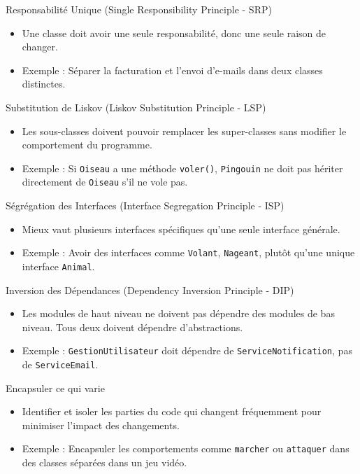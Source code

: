 \documentclass[aspectratio=169]{beamer}
\begin{document}
  \begin{frame}{Responsabilité Unique (Single Responsibility Principle - SRP)}
  \begin{itemize}
      \item Une classe doit avoir une seule responsabilité, donc une seule raison de changer.
      \item Exemple : Séparer la facturation et l'envoi d'e-mails dans deux classes distinctes.
  \end{itemize}
  \end{frame}

  \begin{frame}{Substitution de Liskov (Liskov Substitution Principle - LSP)}
  \begin{itemize}
      \item Les sous-classes doivent pouvoir remplacer les super-classes sans modifier le comportement du programme.
      \item Exemple : Si \texttt{Oiseau} a une méthode \texttt{voler()}, \texttt{Pingouin} ne doit pas hériter directement de \texttt{Oiseau} s'il ne vole pas.
  \end{itemize}
  \end{frame}

  \begin{frame}{Ségrégation des Interfaces (Interface Segregation Principle - ISP)}
  \begin{itemize}
      \item Mieux vaut plusieurs interfaces spécifiques qu'une seule interface générale.
      \item Exemple : Avoir des interfaces comme \texttt{Volant}, \texttt{Nageant}, plutôt qu'une unique interface \texttt{Animal}.
  \end{itemize}
  \end{frame}

  \begin{frame}{Inversion des Dépendances (Dependency Inversion Principle - DIP)}
  \begin{itemize}
      \item Les modules de haut niveau ne doivent pas dépendre des modules de bas niveau. Tous deux doivent dépendre d'abstractions.
      \item Exemple : \texttt{GestionUtilisateur} doit dépendre de \texttt{ServiceNotification}, pas de \texttt{ServiceEmail}.
  \end{itemize}
  \end{frame}

  \begin{frame}{Encapsuler ce qui varie}
  \begin{itemize}
      \item Identifier et isoler les parties du code qui changent fréquemment pour minimiser l'impact des changements.
      \item Exemple : Encapsuler les comportements comme \texttt{marcher} ou \texttt{attaquer} dans des classes séparées dans un jeu vidéo.
  \end{itemize}
  \end{frame}
\end{document}
